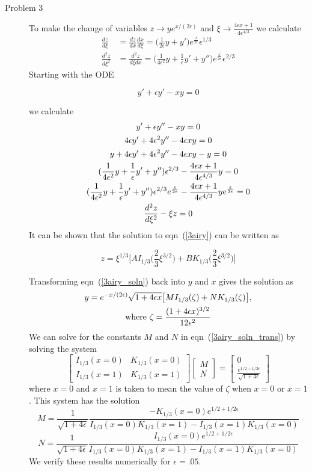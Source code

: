 \documentclass[11pt]{article}
\newcommand{\eq}[1]{\begin{align*}#1\end{align*}}
\newcommand{\eqn}[2]{
  \begin{equation}
    \label{#1}
    #2
  \end{equation}
}
\newcommand{\eps}{\epsilon}
\newcommand{\eqr}[1]{eqn~(\ref{#1})}
\newcommand{\de}[2]{\frac{d #1}{d #2}}
\newcommand{\mat}[2]{\left[\begin{array}{#1}#2\end{array}\right]}
\begin{document}
\begin{description}
\item[Problem 3]
To make the change of variables $z \rightarrow ye^{x/(2\eps)}$ and $\xi \rightarrow \frac{4\eps x +1}{4\eps^{4/3}}$ we calculate
\eq{
  \de{z}{\xi} &= \de{z}{x}\de{x}{\xi} =
  \big(
    \frac{1}{2\eps}y + y'
  \big) e^{\frac{x}{2\eps}} \eps^{1/3}
  \\
  \de{^2 z}{\xi^2} &= \de{^2 z}{\xi dx} =
  \big(
    \frac{1}{4\eps^2} y
    + \frac{1}{\eps} y'
    + y''
  ) e^{\frac{x}{2\eps}} \eps^{2/3}
}
Starting with the ODE
\eqn{3ode}{
  y' + \eps y' - xy = 0
}
we calculate
\begin{gather}
\notag  y' + \eps y'' - xy = 0\\
\notag  4\eps y' + 4\eps^2 y'' - 4\eps xy = 0 \\
\notag  y + 4\eps y' + 4\eps^2 y'' - 4\eps xy - y = 0\\
\notag  (\frac{1}{4\eps^2}y + \frac{1}{\eps}y' + y'')\eps^{2/3}
        -
        \frac{4 \eps x + 1}{4\eps^{4/3}} y = 0\\
\notag  (\frac{1}{4\eps^2}y + \frac{1}{\eps}y' + y'')\eps^{2/3}e^{\frac{x}{2\eps}}
        -
        \frac{4 \eps x + 1}{4\eps^{4/3}} y e^{\frac{x}{2\eps}} = 0\\
\label{3airy}  \de{^2z}{\xi^2} - \xi z = 0
\end{gather}
It can be shown that the solution to \eqr{3airy} can be written as
\eqn{3airy_soln}{
  z = \xi^{1/3}\bigg[
    AI_{1/3}\bigg(
      \frac{2}{3} \xi^{3/2}
    \bigg)
    +
    BK_{1/3}\bigg(
      \frac{2}{3} \xi^{3/2}
    \bigg)
  \bigg]
}
Transforming \eqr{3airy_soln} back into $y$ and $x$ gives the solution as
\begin{gather}
  \label{3airy_soln_trans}
  y = e^{-x/(2\eps)} \sqrt{1+4\eps x}\big[
    MI_{1/3}(\zeta)
    +
    NK_{1/3}(\zeta)
  \big],
  \\
  \notag
  \text{where }
  \zeta = \frac{
    (1 + 4\eps x)^{3/2}
  }{
    12\eps^2
  }
\end{gather}
We can solve for the constants $M$ and $N$ in \eqr{3airy_soln_trans} by solving the system
$$
  \mat{cc}{
    I_{1/3}(x = 0) & K_{1/3}(x = 0) \\
    I_{1/3}(x = 1) & K_{1/3}(x = 1)
  }
  \mat{c}{
    M \\
    N
  }
  =
  \mat{c}{
    0 \\
    \frac{e^{1/2 + 1/2\eps}}{\sqrt{1 + 4\eps}}
  }
$$
where $x=0$ and $x=1$ is taken to mean the value of $\zeta$ when $x = 0$ or $x = 1$.
This system has the solution
$$
M = 
\frac{1}{\sqrt{1 + 4\eps}}
\frac{
  -K_{1/3}(x = 0) e^{1/2 + 1/2\eps}
}{
  I_{1/3}(x = 0)K_{1/3}(x = 1) - I_{1/3}(x = 1)K_{1/3}(x = 0)
}
$$
$$
N = 
\frac{1}{\sqrt{1 + 4\eps}}
\frac{
  I_{1/3}(x = 0) e^{1/2 + 1/2\eps}
}{
  I_{1/3}(x = 0)K_{1/3}(x = 1) - I_{1/3}(x = 1)K_{1/3}(x = 0)
}
$$
We verify these results numerically for $\eps = .05$.
\lstset{caption=Interactive Session for Numerical Results}



\end{description}
\end{document}
